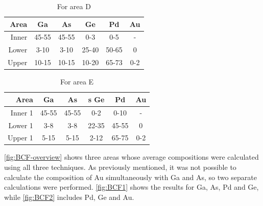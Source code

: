 
\begin{table}
	\caption{For area D}
	\begin{center}
		\begin{tabular}{r|ccccc}			
			Area & Ga & As & Ge & Pd & Au\\ 
			\midrule
			\hline
			Inner & 45-55& 45-55 & 0-3 & 0-5 & -\\
			Lower & 3-10& 3-10 & 25-40 & 50-65 & 0\\
			Upper & 10-15& 10-15 & 10-20 & 65-73 & 0-2\\
			\hline
		\end{tabular} 
	\end{center}
	\label{tab:D-composition}
\end{table}

\begin{table}
	\caption{For area E}
	\begin{center}
		\begin{tabular}{r|ccccc}			
			Area & Ga & As &s Ge & Pd & Au\\ 
			\midrule
			\hline
			Inner 1& 45-55 & 45-55 & 0-2 & 0-10 & -\\
			Lower 1& 3-8 & 3-8 & 22-35 & 45-55 & 0\\
			Upper 1& 5-15 & 5-15 & 2-12 & 65-75 & 0-2\\
			\hline
		\end{tabular} 
	\end{center}
	\label{tab:E-composition}
\end{table}


\cref{fig:BCF-overview} shows three areas whose average compositions were calculated using all three techniques. As previously mentioned, it was not possible to calculate the composition of Au simultaneously with Ga and As, so two separate calculations were performed. \cref{fig:BCF1} shows the results for Ga, As, Pd and Ge, while \cref{fig:BCF2} includes Pd, Ge and Au. 

